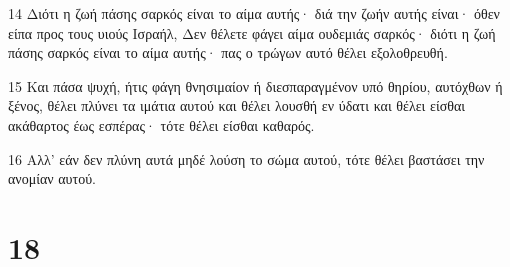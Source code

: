 \par 14 Διότι η ζωή πάσης σαρκός είναι το αίμα αυτής· διά την ζωήν αυτής είναι· όθεν είπα προς τους υιούς Ισραήλ, Δεν θέλετε φάγει αίμα ουδεμιάς σαρκός· διότι η ζωή πάσης σαρκός είναι το αίμα αυτής· πας ο τρώγων αυτό θέλει εξολοθρευθή.
\par 15 Και πάσα ψυχή, ήτις φάγη θνησιμαίον ή διεσπαραγμένον υπό θηρίου, αυτόχθων ή ξένος, θέλει πλύνει τα ιμάτια αυτού και θέλει λουσθή εν ύδατι και θέλει είσθαι ακάθαρτος έως εσπέρας· τότε θέλει είσθαι καθαρός.
\par 16 Αλλ' εάν δεν πλύνη αυτά μηδέ λούση το σώμα αυτού, τότε θέλει βαστάσει την ανομίαν αυτού.

\chapter{18}


